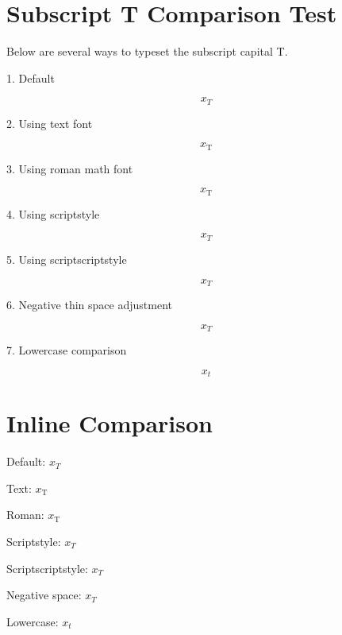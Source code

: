 \documentclass[12pt]{article}
\begin{document}
	
	\section*{Subscript T Comparison Test}
	
	Below are several ways to typeset the subscript capital T.
	
	\bigskip
	
	1. Default
	
	\[
	x_T
	\]
	
	\bigskip
	
	2. Using text font
	
	\[
	x_{\text{T}}
	\]
	
	\bigskip
	
	3. Using roman math font
	
	\[
	x_{\mathrm{T}}
	\]
	
	\bigskip
	
	4. Using scriptstyle
	
	\[
	x_{\scriptstyle T}
	\]
	
	\bigskip
	
	5. Using scriptscriptstyle
	
	\[
	x_{\scriptscriptstyle T}
	\]
	
	\bigskip
	
	6. Negative thin space adjustment
	
	\[
	x_{\!T}
	\]
	
	\bigskip
	
	7. Lowercase comparison
	
	\[
	x_t
	\]
	
	\bigskip
	
	\section*{Inline Comparison}
	
	Default: $x_T$  
	
	Text: $x_{\text{T}}$  
	
	Roman: $x_{\mathrm{T}}$  
	
	Scriptstyle: $x_{\scriptstyle T}$  
	
	Scriptscriptstyle: $x_{\scriptscriptstyle T}$  
	
	Negative space: $x_{\!T}$  
	
	Lowercase: $x_t$
	
\end{document}
